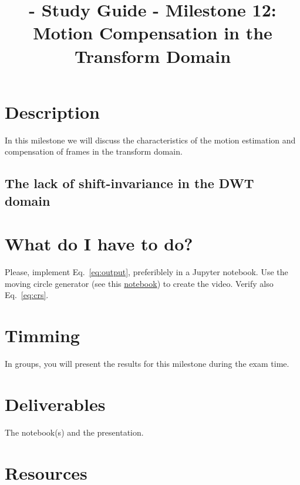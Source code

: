 
\title{\SM{} - Study Guide - Milestone 12: Motion Compensation in the Transform Domain}

\maketitle

\tableofcontents

\section{Description}

In this milestone we will discuss the characteristics of the motion
estimation and compensation of frames
in the transform domain.



\subsection{The lack of shift-invariance in the DWT domain}
\section{What do I have to do?}

Please, implement Eq.~\ref{eq:output}, preferiblely in a Jupyter
notebook. Use the moving circle generator (see
this \href{https://github.com/Sistemas-Multimedia/Sistemas-Multimedia.github.io/blob/master/milestones/11-MC_in_DWT_domain/DWT_shift_invariance.ipynb}{notebook})
to create the video. Verify also Eq.~\ref{eq:crs}.

\section{Timming}

In groups, you will present the results for this milestone during the
exam time.

\section{Deliverables}

The notebook(s) and the presentation.

\section{Resources}





